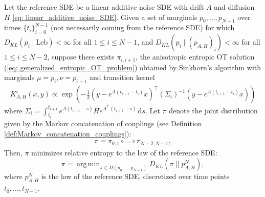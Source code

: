 \documentclass[twoside,11pt]{article}
\DeclareMathOperator*{\argmin}{arg\,min}
\begin{document}
\begin{prop}
Let the reference SDE be a linear additive noise SDE  with drift $A$ and diffusion $H$ \eqref{eq: linear_additive_noise_SDE}. Given a set of marginals $p_0,\ldots, p_{{N-1}}$ over times $\{t_i\}_{i=0}^{N-1}$ (not necessarily coming from the reference SDE) for which $D_{KL}(p_{i}\mid\text{Leb})<\infty$ for all $1\leq i\leq N-1$, and $D_{KL}(p_{i}\mid(p_{A,H})_{i})<\infty$ for all $1\leq i \leq N-2$, suppose there exists $\pi_{i,i+1}$, the anisotropic entropic OT solution (\ref{eq: generalized_entropic_OT_problem})  obtained by Sinkhorn's algorithm with marginals $\mu = p_i, \nu = p_{i+1}$ and transition kernel
\begin{align}
    K_{A,H}^{i}(x,y) \propto \exp(-\frac12 (y-e^{A (t_{i+1}-t_{i})}x)^\top(\Sigma_i)^{-1}(y-e^{A(t_{i+1}-t_{i})}x))
    \label{eq: gibbs_kernel_ap}
\end{align}
where $\Sigma_{i} = \int_{t_i}^{t_{i+1}} e^{A(t_{i+1}-s)} H e^{A^\top(t_{i+1}-s)} \, \mathrm{d}s$. Let $\pi$ denote the joint distribution given by the Markov concatenation of couplings (see Definition \ref{def:Markov_concatenation_couplings}):
\begin{align*}
    \pi = \pi_{0,1} \circ \ldots \circ \pi_{N-2,N-1},
\end{align*}
Then, $\pi$ minimizes relative entropy to the law of the reference SDE:
$$
\pi = \argmin_{\pi \in \Pi(p_{0}, \ldots, p_{N-1})} D_{KL}(\pi \| p_{A, H}^N),
$$
where $p_{A,H}^N$ is the law of the reference SDE, discretized over time points $t_0, \ldots, t_{N-1}$.
\label{prop: md_Sinkhorn_optimal}
\end{prop}
\end{document}
